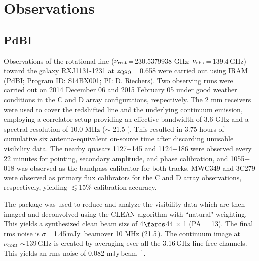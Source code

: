 \documentclass[]{emulateapj}
\begin{document}
\section{Observations} \label{sec:obs}
\subsection{PdBI \bco} %
Observations of the \bco rotational line
($\nu_{\rm rest}$\,=\,230.5379938 GHz; $\nu_{\rm obs}$\,=\,139.4\,GHz)
toward the \gl galaxy RXJ1131-1231 at $z_{\rm QSO}$\,=\,0.658
were carried out using IRAM \pdbi (PdBI; Program ID: S14BX001; PI: D.
Riechers). Two observing runs were carried out on 2014 December 06 and 2015
February 05 under good weather conditions in the C and D array configurations,
respectively. The 2 mm receivers were used to cover the redshifted \bco line
and the underlying continuum emission, employing a correlator setup providing
an effective bandwidth of 3.6 GHz and a spectral resolution of 10.0 MHz ($\sim$
21.5 \kms). This resulted in 3.75 hours of cumulative six antenna-equivalent on-source
 time after discarding unusable visibility data.
The nearby quasars 1127$-$145 and 1124$-$186 were observed every 22 minutes
for pointing, secondary amplitude, and phase calibration, and 1055$+$018 was
observed as the bandpass calibrator for both tracks.
MWC349 and 3C279 were observed as primary flux calibrators for the C and D
array observations, respectively, yielding $\lesssim$15\% calibration accuracy.

The  package was used to reduce and analyze the visibility data
which are then imaged and deconvolved using the CLEAN algorithm with ``natural"
weighting. This yields a synthesized clean beam size of 4$\farcs$44 $\times$ 1 (PA = 13\degr).
The final rms noise is $\sigma$\,=\,1.45\,mJy\,\kms
beam\pmOne over 10 MHz (21.5\,\kms). The continuum image at $\nu_{\rm cont}\sim$139\,GHz
is created by averaging over all the 3.16\,GHz line-free channels. This
yields an rms noise of 0.082 mJy\,beam$^{-1}$. %
\end{document}
